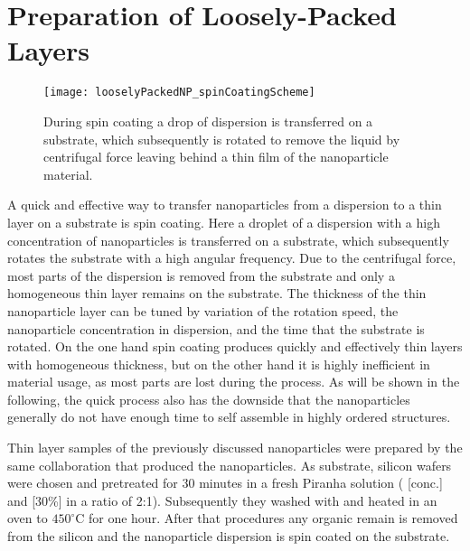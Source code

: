 \documentclass[\main/dresen_thesis.tex]{subfiles}
\renewcommand{\thisPath}{\main/chapters/looselyPackedNS}
\begin{document}
  

  \section{Preparation of Loosely-Packed Layers}
    \begin{figure}[tb]
      \centering
      \texttt{[image: looselyPackedNP\_spinCoatingScheme]}
      \caption{\label{fig:looselyPackedNP:preparation:spinCoatingScheme}During spin coating a drop of dispersion is transferred on a substrate, which subsequently is rotated to remove the liquid by centrifugal force leaving behind a thin film of the nanoparticle material.}
    \end{figure}

    A quick and effective way to transfer nanoparticles from a dispersion to a thin layer on a substrate is spin coating.
    Here a droplet of a dispersion with a high concentration of nanoparticles is transferred on a substrate, which subsequently rotates the substrate with a high angular frequency.
    Due to the centrifugal force, most parts of the dispersion is removed from the substrate and only a homogeneous thin layer remains on the substrate.
    The thickness of the thin nanoparticle layer can be tuned by variation of the rotation speed, the nanoparticle concentration in dispersion, and the time that the substrate is rotated.
    On the one hand spin coating produces quickly and effectively thin layers with homogeneous thickness, but on the other hand it is highly inefficient in material usage, as most parts are lost during the process.
    As will be shown in the following, the quick process also has the downside that the nanoparticles generally do not have enough time to self assemble in highly ordered structures.

    Thin layer samples of the previously discussed nanoparticles were prepared by the same collaboration that produced the nanoparticles.
    As substrate, silicon wafers were chosen and pretreated for 30 minutes in a fresh Piranha solution ( [conc.] and  [30\%] in a ratio of 2:1). Subsequently they washed with  and heated in an oven to $450 ^\circ \mathrm{C}$ for one hour.
    After that procedures any organic remain is removed from the silicon and the nanoparticle dispersion is spin coated on the substrate.
\end{document}

